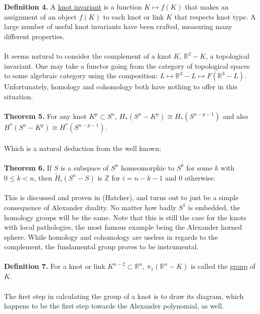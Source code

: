 \documentclass{article}
\begin{document}
\\
\\
\textbf{Definition 4.} A \underline{knot invariant} is a function $K \longmapsto f(K)$ that makes an assignment of an object $f(K)$ to each knot or link $K$ that respects knot type.  A large number of useful knot invariants have been crafted, measuring many different properties.
\\
\\
It seems natural to consider the complement of a knot $K$, $\mathbb{R}^3 - K$, a topological invariant.  One may take a functor going
from the category of topological spaces to some algebraic category using the composition: $L \longmapsto \mathbb{R}^3 - L \longmapsto F(\mathbb{R}^3 - L)$.  Unfortunately, homology and cohomology both have nothing to offer in this situation.
\\
\\
\textbf{Theorem 5.} For any knot $K^p \subset S^n$, $H_*(S^n - K^p) \cong H_*(S^{n-p-1})$ and also $H^*(S^n - K^p) \cong H^*(S^{n-p-1})$.
\\
\\ Which is a natural deduction from the well known:
\\
\\
\textbf{Theorem 6.} If $S$ is a subspace of $S^n$ homeomorphic to $S^k$ for some $k$ with $0 \le k < n$, then $\tilde{H}_i(S^n - S)$ is $\mathbb{Z}$ for $i = n - k - 1$ and 0 otherwise.
\\
\\This is discussed and proven in (Hatcher), and turns out to just be a simple consequence of Alexander duality.  No matter how badly $S^1$ is embedded, the homology groups will be the same.  Note that this is still the case for the knots with local pathologies, the most famous example being the Alexander horned sphere.  While homology and cohomology are useless in regards to the complement, the fundamental group proves to be instrumental. 
\\
\\
\textbf{Definition 7.} For a knot or link $K^{n-2} \subset \mathbb{R}^n$, $\pi_1(\mathbb{R}^n - K)$ is called the \underline{group} of $K$.
\\
\\
The first step in calculating the group of a knot is to draw its diagram, which happens to be the first step towards the Alexander polynomial, as well.
\end{document}
